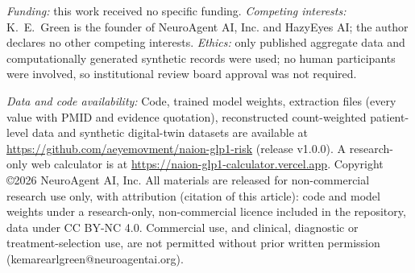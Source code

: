 \documentclass[journal]{IEEEtran}
\begin{document}
\textit{Funding:} this work received no specific funding. \textit{Competing interests:} K.~E.~Green is the founder of NeuroAgent AI, Inc. and HazyEyes AI; the author declares no other competing interests. \textit{Ethics:} only published aggregate data and computationally generated synthetic records were used; no human participants were involved, so institutional review board approval was not required.

\textit{Data and code availability:} Code, trained model weights, extraction files (every value with PMID and evidence quotation), reconstructed count-weighted patient-level data and synthetic digital-twin datasets are available at \url{https://github.com/aeyemovment/naion-glp1-risk} (release v1.0.0). A research-only web calculator is at \url{https://naion-glp1-calculator.vercel.app}. Copyright \copyright 2026 NeuroAgent AI, Inc. All materials are released for non-commercial research use only, with attribution (citation of this article): code and model weights under a research-only, non-commercial licence included in the repository, data under CC BY-NC 4.0. Commercial use, and clinical, diagnostic or treatment-selection use, are not permitted without prior written permission (kemarearlgreen@neuroagentai.org).


\end{document}
